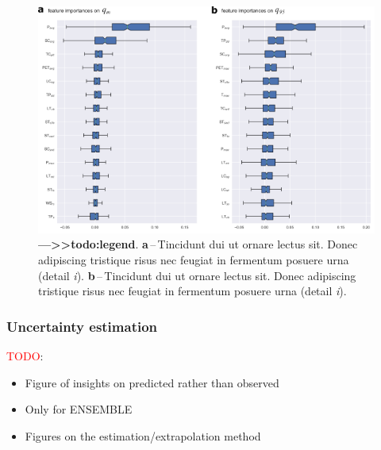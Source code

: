 \documentclass[12pt]{article}
\begin{document}
\FloatBarrier
\begin{figure}[htb] %
	\centering                                       
	\includegraphics[width=0.98\linewidth]{figs/05_importance.png}    
	\caption[Importance of features]
	{ \textbf{---\;>>todo:legend}.
		\textbf{a}\,--\,Tincidunt dui ut ornare lectus sit. Donec adipiscing tristique risus nec feugiat in fermentum posuere urna (detail \textrm{\textit{i}}).
		\textbf{b}\,--\,Tincidunt dui ut ornare lectus sit. Donec adipiscing tristique risus nec feugiat in fermentum posuere urna (detail \textrm{\textit{i}}).		
	}
	\label{fig:importance}  %
\end{figure}

\subsubsection{Uncertainty estimation} \label{sec:datagen:proceval:uncert}

\par \textcolor{red}{TODO}:
\begin{itemize}
  \item Figure of insights on predicted rather than observed
  \item Only for ENSEMBLE
  \item Figures on the estimation/extrapolation method
\end{itemize}
\end{document}
